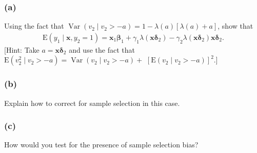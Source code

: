 \documentclass[10pt, a4paper]{article}
\begin{document}
    \subsubsection*{(a)}
      Using the fact that $\operatorname{Var}(v_2 \mid v_2>-a)=1-\lambda(a)[\lambda(a)+a]$, show that
      \begin{gather*}
        \mathrm{E}(y_1 \mid \mathbf{x}, y_2=1)=\mathbf{x}_1 \boldsymbol{\beta}_1+\gamma_1 \lambda(\mathbf{x} \boldsymbol{\delta}_2)-\gamma_2 \lambda(\mathbf{x} \boldsymbol{\delta}_2) \mathbf{x} \boldsymbol{\delta}_2 .
      \end{gather*}
    [Hint: Take $a=\mathbf{x} \boldsymbol{\delta}_2$ and use the fact that $\mathrm{E}(v_2^2 \mid v_2>-a)=\operatorname{Var}(v_2 \mid v_2>-a)+$ $[\mathrm{E}(v_2 \mid v_2>-a)]^2$.]
    \subsubsection*{(b)}
      Explain how to correct for sample selection in this case.
    \subsubsection*{(c)}
      How would you test for the presence of sample selection bias?
\end{document}
